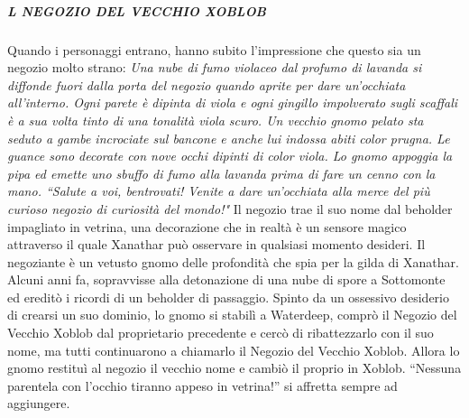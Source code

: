 \documentclass{article}
\begin{document}
                        \subparagraph{L NEGOZIO DEL VECCHIO XOBLOB} Quando i personaggi entrano, hanno subito l'impressione che questo sia un negozio molto strano:\newline
\textit{Una nube di fumo violaceo dal profumo di lavanda si diffonde fuori dalla porta del negozio quando aprite per dare un'occhiata all'interno. Ogni parete è dipinta di viola e ogni gingillo impolverato sugli scaffali è a sua volta tinto di una tonalità viola scuro. Un vecchio gnomo pelato sta seduto a gambe incrociate sul bancone e anche lui indossa abiti color prugna. Le guance sono decorate con nove occhi dipinti di color viola. 
Lo gnomo appoggia la pipa ed emette uno sbuffo di fumo alla lavanda prima di fare un cenno con la mano. 
“Salute a voi, bentrovati! Venite a dare un'occhiata alla merce del più curioso negozio di curiosità del mondo!"}\newline
Il negozio trae il suo nome dal beholder impagliato in vetrina, una decorazione che in realtà è un sensore magico attraverso il quale Xanathar può osservare in qualsiasi momento desideri. 
Il negoziante è un vetusto gnomo delle profondità che spia per la gilda di Xanathar. Alcuni anni fa, sopravvisse alla detonazione di una nube di spore a Sottomonte ed ereditò i ricordi di un beholder di passaggio. Spinto da un ossessivo desiderio di crearsi un suo dominio, lo gnomo si stabilì a Waterdeep, comprò il Negozio del Vecchio Xoblob dal proprietario precedente e cercò di ribattezzarlo con il suo nome, ma tutti continuarono a chiamarlo il Negozio del Vecchio Xoblob. Allora lo gnomo restituì al negozio il vecchio nome e cambiò il proprio in Xoblob. “Nessuna parentela con l'occhio tiranno appeso in vetrina!” si affretta sempre ad aggiungere.\newline
\end{document}
